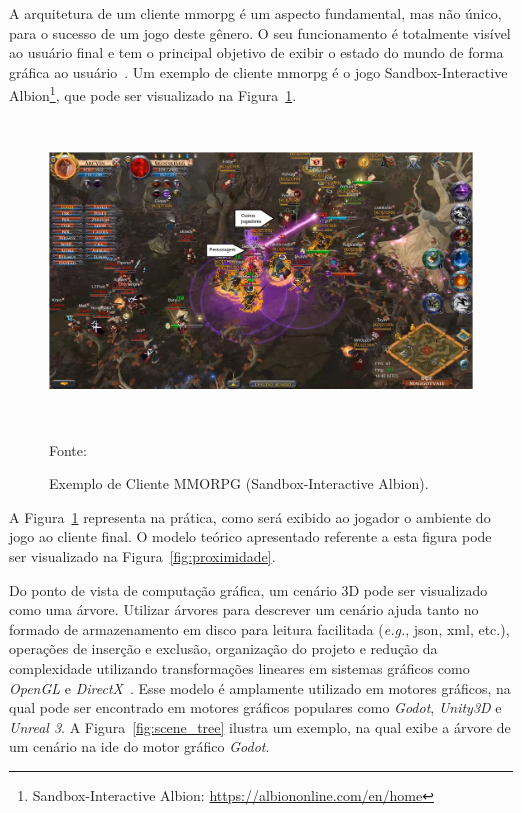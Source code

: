 A arquitetura de um cliente \ac{mmorpg} é um aspecto fundamental, mas não único, para o sucesso de um jogo deste gênero.
%
O seu funcionamento é totalmente visível ao usuário final e tem o principal objetivo de exibir o estado do mundo de forma gráfica ao usuário~\cite{albion_online_unite}.
%
Um exemplo de cliente \ac{mmorpg} é o jogo Sandbox-Interactive Albion\footnote{Sandbox-Interactive Albion: \url{https://albiononline.com/en/home}}, que pode ser visualizado na Figura~\ref{fig:cliente_albion}.



\begin{figure}[htb!]
\caption{Exemplo de Cliente MMORPG (Sandbox-Interactive Albion).}
\label{fig:cliente_albion}
\includegraphics[height=8cm]{img/cap2/cliente_albion.png}
\centering

Fonte:~\cite{albion_online_unite}
\end{figure}

A Figura~\ref{fig:cliente_albion} representa na prática, como será exibido ao jogador o ambiente do jogo ao cliente final.
%
O modelo teórico apresentado referente a esta figura pode ser visualizado na Figura~\ref{fig:proximidade}.


Do ponto de vista de computação gráfica, um cenário 3D pode ser visualizado como uma árvore.
%
Utilizar árvores para descrever um cenário ajuda tanto no formado de armazenamento em disco para leitura facilitada (\textit{e.g.}, \ac{json}, \ac{xml}, etc.), operações de inserção e exclusão, organização do projeto e redução da complexidade utilizando transformações lineares em sistemas gráficos como \textit{OpenGL} e \textit{DirectX}~\cite{Lengyel2011Jun}.
%
Esse modelo é amplamente utilizado em motores gráficos, na qual pode ser encontrado em motores gráficos populares como \textit{Godot}, \textit{Unity3D} e \textit{Unreal 3}.
%
A Figura~\ref{fig:scene_tree} ilustra um exemplo, na qual exibe a árvore de um cenário na \ac{ide} do motor gráfico \textit{Godot}.



